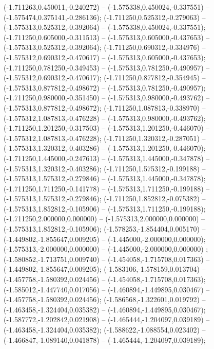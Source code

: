  (-1.711263,0.450011,-0.240272) -- (-1.575338,0.450024,-0.337551) -- (-1.575474,0.375141,-0.286136);
 (-1.711250,0.525312,-0.279063) -- (-1.575313,0.525312,-0.392064) -- (-1.575338,0.450024,-0.337551);
 (-1.711250,0.605000,-0.311513) -- (-1.575313,0.605000,-0.437653) -- (-1.575313,0.525312,-0.392064);
 (-1.711250,0.690312,-0.334976) -- (-1.575312,0.690312,-0.470617) -- (-1.575313,0.605000,-0.437653);
 (-1.711250,0.781250,-0.349453) -- (-1.575313,0.781250,-0.490957) -- (-1.575312,0.690312,-0.470617);
 (-1.711250,0.877812,-0.354945) -- (-1.575313,0.877812,-0.498672) -- (-1.575313,0.781250,-0.490957);
 (-1.711250,0.980000,-0.351450) -- (-1.575313,0.980000,-0.493762) -- (-1.575313,0.877812,-0.498672);
 (-1.711250,1.087813,-0.338970) -- (-1.575312,1.087813,-0.476228) -- (-1.575313,0.980000,-0.493762);
 (-1.711250,1.201250,-0.317503) -- (-1.575313,1.201250,-0.446070) -- (-1.575312,1.087813,-0.476228);
 (-1.711250,1.320312,-0.287051) -- (-1.575313,1.320312,-0.403286) -- (-1.575313,1.201250,-0.446070);
 (-1.711250,1.445000,-0.247613) -- (-1.575313,1.445000,-0.347878) -- (-1.575313,1.320312,-0.403286);
 (-1.711250,1.575312,-0.199188) -- (-1.575313,1.575312,-0.279846) -- (-1.575313,1.445000,-0.347878);
 (-1.711250,1.711250,-0.141778) -- (-1.575313,1.711250,-0.199188) -- (-1.575313,1.575312,-0.279846);
 (-1.711250,1.852812,-0.075382) -- (-1.575313,1.852812,-0.105906) -- (-1.575313,1.711250,-0.199188);
 (-1.711250,2.000000,0.000000) -- (-1.575313,2.000000,0.000000) -- (-1.575313,1.852812,-0.105906);
 (-1.578253,-1.854404,0.005170) -- (-1.449802,-1.855647,0.009205) -- (-1.445000,-2.000000,0.000000);
 (-1.575313,-2.000000,0.000000) -- (-1.445000,-2.000000,0.000000) ;
 (-1.580852,-1.713751,0.009740) -- (-1.454058,-1.715708,0.017363) -- (-1.449802,-1.855647,0.009205);
 (-1.583106,-1.578159,0.013704) -- (-1.457758,-1.580392,0.024456) -- (-1.454058,-1.715708,0.017363);
 (-1.585012,-1.447740,0.017056) -- (-1.460894,-1.449895,0.030467) -- (-1.457758,-1.580392,0.024456);
 (-1.586568,-1.322601,0.019792) -- (-1.463458,-1.324404,0.035382) -- (-1.460894,-1.449895,0.030467);
 (-1.587772,-1.202842,0.021908) -- (-1.465444,-1.204097,0.039189) -- (-1.463458,-1.324404,0.035382);
 (-1.588622,-1.088554,0.023402) -- (-1.466847,-1.089140,0.041878) -- (-1.465444,-1.204097,0.039189);
